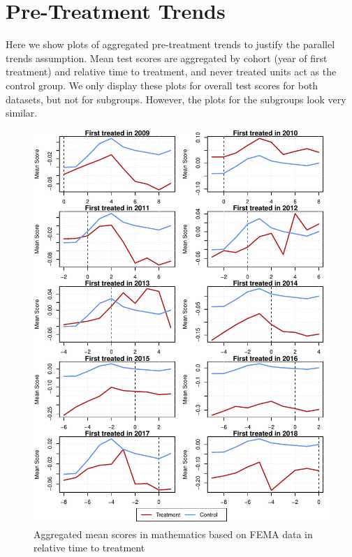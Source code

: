 \newpage

\section{Pre-Treatment Trends} \label{PreTrends}

Here we show plots of aggregated pre-treatment trends to justify the parallel trends assumption. Mean test scores are aggregated by cohort (year of first treatment) and relative time to treatment, and never treated units act as the control group. We only display these plots for overall test scores for both datasets, but not for subgroups. However, the plots for the subgroups look very similar.

\begin{figure}[!h]
	\centering
	\includegraphics[scale=1]{"../Code & Data/ParTrendsPlotMathematicsFEMA.pdf"}
	\caption{Aggregated mean scores in mathematics based on FEMA data in relative time to treatment}
	\label{PreTrendsMath}
\end{figure}

